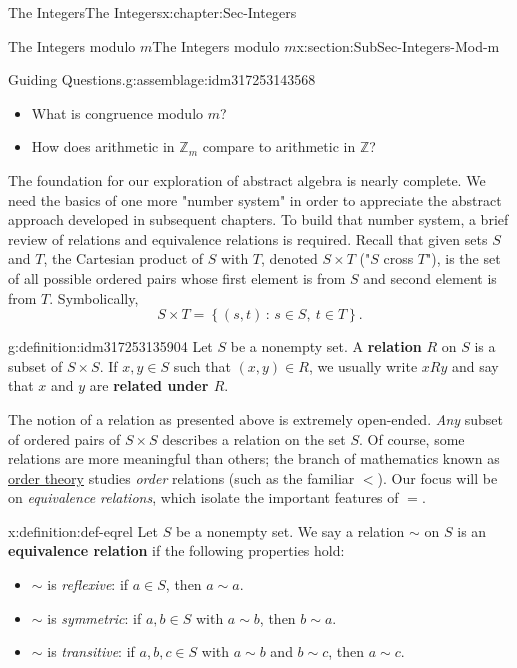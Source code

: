 \documentclass[oneside,10pt,]{book}
\newcommand{\terminology}[1]{\textbf{#1}}
\numberwithin{equation}{section}
\newcommand{\setof}[2]{{\left\{#1\,\colon\,#2\right\}}}
\def\Z{{\mathbb Z}}
\newcommand{\lt}{<}
\begin{document}
\begin{chapterptx}{The Integers}{}{The Integers}{}{}{x:chapter:Sec-Integers}
\begin{sectionptx}{The Integers modulo \(m\)}{}{The Integers modulo \(m\)}{}{}{x:section:SubSec-Integers-Mod-m}
\begin{assemblage}{Guiding Questions.}{g:assemblage:idm317253143568}
\begin{itemize}[label=\textbullet]
\item{}What is congruence modulo \(m\)?%
\item{}How does arithmetic in \(\Z_m\) compare to arithmetic in \(\Z\)?%
\end{itemize}
%
\end{assemblage}
The foundation for our exploration of abstract algebra is nearly complete. We need the basics of one more "number system" in order to appreciate the abstract approach developed in subsequent chapters. To build that number system, a brief review of relations and equivalence relations is required. Recall that given sets \(S\) and \(T\), the Cartesian product of \(S\) with \(T\), denoted \(S\times T\) ("\(S\) cross \(T\)"), is the set of all possible ordered pairs whose first element is from \(S\) and second element is from \(T\). Symbolically,%
%
\begin{equation*}
S\times T = \setof{(s,t)}{s\in S, \ t\in T}.
\end{equation*}
\begin{definition}{}{g:definition:idm317253135904}%
%
Let \(S\) be a nonempty set. A \terminology{relation} \(R\) on \(S\) is a subset of \(S\times S\). If \(x,y\in S\) such that \((x,y)\in R\), we usually write \(xRy\) and say that \(x\) and \(y\) are \terminology{related under \(R\)}.%
\end{definition}
The notion of a relation as presented above is extremely open-ended. \emph{Any} subset of ordered pairs of \(S\times S\) describes a relation on the set \(S\). Of course, some relations are more meaningful than others; the branch of mathematics known as \href{https://en.wikipedia.org/wiki/Order_theory}{order theory} studies \emph{order} relations (such as the familiar \(\lt\)). Our focus will be on \emph{equivalence relations}, which isolate the important features of \(=\).%
\begin{definition}{}{x:definition:def-eqrel}%
%
%
%
Let \(S\) be a nonempty set. We say a relation \(\sim\) on \(S\) is an \terminology{equivalence relation} if the following properties hold:%
\begin{itemize}[label=\textbullet]
\item{}\(\sim\) is \emph{reflexive}: if \(a\in S\), then \(a\sim a\).%
\item{}\(\sim\) is \emph{symmetric}: if \(a,b\in S\) with \(a\sim b\), then \(b\sim a\).%
\item{}\(\sim\) is \emph{transitive}: if \(a,b,c\in S\) with \(a\sim b\) and \(b\sim c\), then \(a\sim c\).%

\end{itemize}
\end{definition}
\end{sectionptx}
\end{chapterptx}
\end{document}
